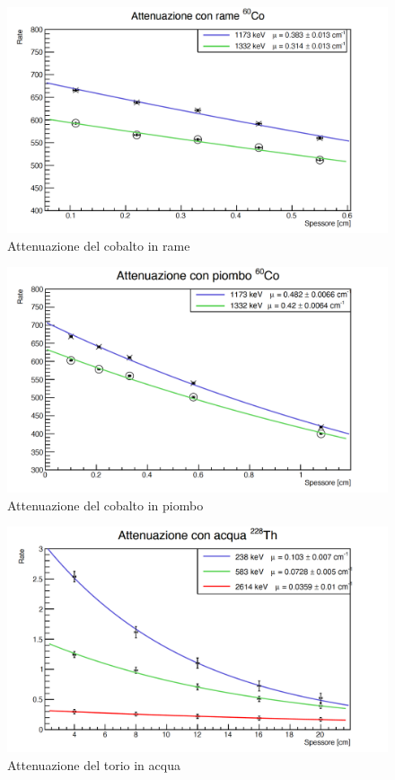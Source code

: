 \documentclass[a4paper,10pt]{article}
\begin{document}
\begin{figure}[H]
    \centering
    \includegraphics[scale=0.6]{grafici/attenuazionecobaltorame}
    \caption{Attenuazione del cobalto in rame}
\end{figure}

\begin{figure}[H]
    \centering
    \includegraphics[scale=0.6]{grafici/attenuazionecobaltopiombo}
    \caption{Attenuazione del cobalto in piombo}
\end{figure}

\begin{figure}[H]
    \centering
    \includegraphics[scale=0.6]{grafici/attenuazionetorioacqua}
    \caption{Attenuazione del torio in acqua}
\end{figure}
\end{document}
